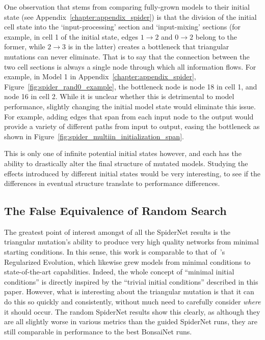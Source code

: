 One observation that stems from comparing fully-grown models to their initial state (see Appendix~\ref{chapter:appendix_spider})
is that the division of the initial cell state into the `input-processing' section and `input-mixing' sections (for example, in
cell 1 of the initial state, edges $1\rightarrow2$ and $0\rightarrow2$ belong to the former, while $2\rightarrow3$ is in
the latter) creates a bottleneck that triangular mutations can never eliminate. That is to say that the connection
between the two cell sections is always a single node through which all information flows. For example, in Model 1 in
Appendix~\ref{chapter:appendix_spider}, Figure~\ref{fig:spider_rand0_example}, the bottleneck node
is node 18 in cell 1, and node 16 in cell 2. While it is unclear whether this is detrimental to model performance,
slightly changing the initial model state would eliminate this issue. For example, adding edges that span from each
input node to the output would provide a variety of different paths from input to output, easing the bottleneck as shown
in Figure~\ref{fig:spider_multiin_initialization_span}.

This is only one of infinite potential initial states however, and each has the ability to drastically alter the final
structure of mutated models. Studying the effects introduced by different initial states would be very interesting,
to see if the differences in eventual structure translate to performance differences.


\subsection{The False Equivalence of Random Search}
The greatest point of interest amongst of all the SpiderNet results is the triangular mutation's ability to produce
very high quality networks from minimal starting conditions. In this sense, this work is comparable to that
of~\cite{real2018}'s Regularized Evolution, which likewise grew models from minimal conditions
to state-of-the-art capabilities. Indeed, the whole concept of ``minimal initial conditions'' is directly inspired by
the ``trivial initial conditions'' described in this paper. However, what is interesting about the triangular mutation is that it can do this so quickly and consistently,
without much need to carefully consider \textit{where} it should occur. The random SpiderNet results show this
clearly, as although they are all slightly worse in various metrics than the guided SpiderNet runs, they are still comparable
in performance to the best BonsaiNet runs.

